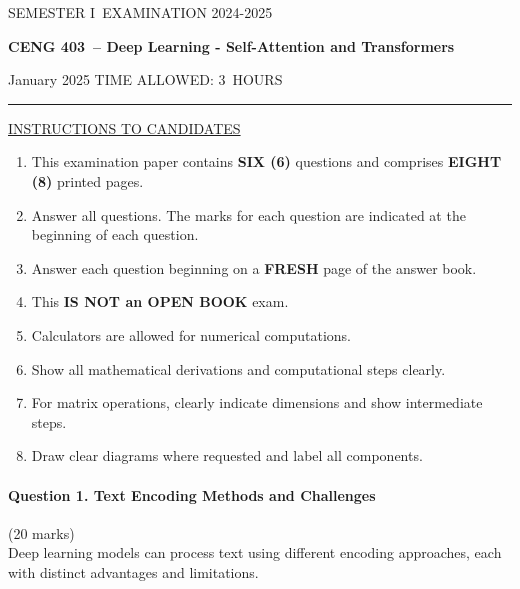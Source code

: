 \documentclass[12pt]{article}
\newcommand{\masunitnumber}{CENG 403}
\newcommand{\examdate}{January 2025}
\newcommand{\academicyear}{2024-2025}
\newcommand{\semester}{I}
\newcommand{\coursename}{Deep Learning - Self-Attention and Transformers}
\newcommand{\numberofhours}{3}
\begin{document}
\setlength{\headsep}{5truemm}
\setlength{\headheight}{14.5truemm}
\setlength{\voffset}{-0.45truein}
\renewcommand{\headrulewidth}{0.0pt}
\begin{center}
SEMESTER \semester\ EXAMINATION \academicyear
\end{center}
\begin{center}
{\bf \masunitnumber\ -- \coursename}
\end{center}
\vspace{20truemm}
\noindent \examdate\hspace{45truemm} TIME ALLOWED: \numberofhours\ HOURS
\vspace{19truemm}
\hrule
\vspace{19truemm}
\noindent\underline{INSTRUCTIONS TO CANDIDATES}
\vspace{8truemm}
\begin{enumerate}
\item This examination paper contains {\bf SIX (6)} questions and comprises 
{\bf EIGHT (8)} printed pages.
\item Answer all questions. 
The marks for each question are indicated at the beginning of each question.
\item Answer each question beginning on a {\bf FRESH} page of the answer book.
\item This {\bf IS NOT an OPEN BOOK} exam.
\item Calculators are allowed for numerical computations.
\item Show all mathematical derivations and computational steps clearly.
\item For matrix operations, clearly indicate dimensions and show intermediate steps.
\item Draw clear diagrams where requested and label all components.
\end{enumerate}
\newpage
\lhead{}
\rhead{\masunitnumber}
\chead{}
\lfoot{}
\cfoot{\thepage}
\rfoot{}
\setlength{\footskip}{45pt}
\paragraph{Question 1. Text Encoding Methods and Challenges}\hfill (20 marks)\\
Deep learning models can process text using different encoding approaches, each with distinct advantages and limitations.
\end{document}
